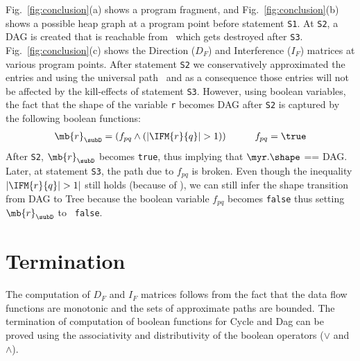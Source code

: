 \begin{example} {\rm
 Fig.~\ref{fig:conclusion}(a) shows a program fragment, and
 Fig.~\ref{fig:conclusion}(b) shows a possible heap graph at
 a program point before statement {\tt S1}.  At {\tt S2}, a
 DAG is created that is reachable from \myr\ which gets
 destroyed after {\tt S3}.  
 Fig.~\ref{fig:conclusion}(c) shows the Direction
 ($D_F$) and Interference ($I_F$) matrices at
 various program points.  After statement {\tt S2} we
 conservatively approximated the entries  and
  using the universal path \upath\ and as a
 consequence those entries will not be affected by the
 kill-effects of statement {\tt S3}. However, using boolean
 variables, the fact that the shape of the variable {\tt r} becomes DAG
 after {\tt S2} is captured by the following boolean
 functions:
 \begin{eqnarray*}
   \mb{r}_{\subD} = (f_{pq} \wedge (|\IFM{r}{q}| > 1))
   &\qquad& f_{pq} = \true
 \end{eqnarray*}
 After {\tt S2}, $\mb{r}_{\subD}$ becomes {\tt true}, thus
 implying that $\myr.\shape$ == DAG.  Later, at statement
 {\tt S3}, the path due to $f_{pq}$ is broken. Even
 though the inequality $| \IFM{r}{q} | > 1 |$ still holds
 (because of \upath), we can still infer the shape transition
 from DAG to Tree because the boolean variable $f_{pq}$
 becomes {\tt false} thus setting $\mb{r}_{\subD}$ to {\tt
   false}.  } \hfill\psframebox{}
\end{example}

\section{Termination} \label{Termination_Criteria}

\newcommand{\GenSym}{\Psi}
\newcommand{\KillSym}{\gamma}
The computation of $D_F$ and $I_F$ matrices follows from the
fact that the data flow functions are monotonic and the sets
of approximate paths are bounded.
The termination of computation of boolean functions for Cycle and Dag can be proved using the associativity 
and distributivity of the boolean operators ($\vee$ and $\wedge$).

